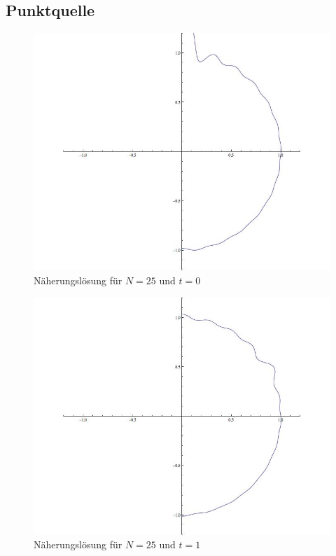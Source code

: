 \subsection{Punktquelle}
\begin{figure}
\begin{center}
\includegraphics[width=\hsize]{../common/graphics/tsunami0}
\end{center}
\caption{Näherungslösung für $N=25$ und $t=0$\label{tsunami0}}
\end{figure}
\begin{figure}
\begin{center}
\includegraphics[width=\hsize]{../common/graphics/tsunami50}
\end{center}
\caption{Näherungslösung für $N=25$ und $t=1$\label{tsunami50}}
\end{figure}

